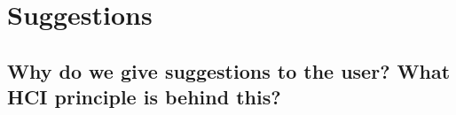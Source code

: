 \documentclass[]{article}
\begin{document}
\clearpage

\section{Suggestions}

\subsection{Why do we give suggestions to the user? What HCI principle is behind this?}




\end{document}
